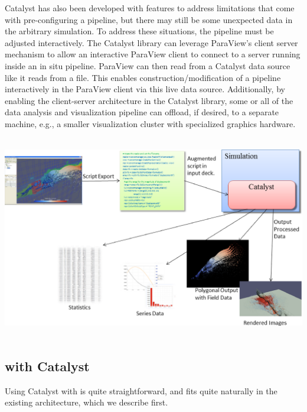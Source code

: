 Catalyst has also been developed with features to address limitations that come with pre-configuring a pipeline, but there may still be some unexpected data in the arbitrary simulation. To address these situations, the pipeline must be adjusted interactively.
The Catalyst library can leverage ParaView's client server mechanism to allow an
interactive ParaView client to connect to a server running inside an in situ
pipeline. ParaView can then read from a Catalyst data source like it reads from
a file. This enables construction/modification of a pipeline interactively in the ParaView client via this live data source. Additionally, by enabling the client-server architecture in the Catalyst library, some or all of the data analysis and visualization pipeline can offload, if desired, to a separate machine, e.g., a smaller visualization cluster with specialized graphics hardware.

~\
\includegraphics[scale=0.47]{pictures/CatalystFullWorkFlow.eps}
\label{fig:catalyst}
\vspace{+0.04in}
~\

\subsection{\CS with Catalyst}

Using Catalyst with \CS is quite straightforward, and fits
quite naturally in the existing architecture, which we describe first.



